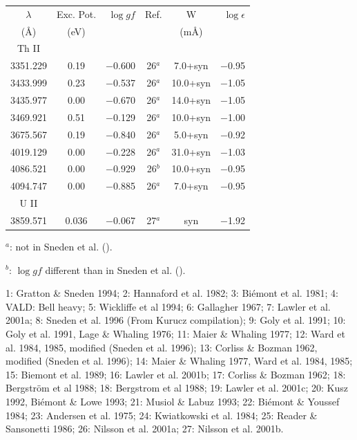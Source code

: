 \documentclass{aa}
\begin{document}
\begin{table}
\begin{tabular}{ccrccr}
\hline\hline
$\lambda$ & Exc. Pot. & $\log gf$ & Ref. & W & $\log \epsilon$ \\
  (\AA)   & (eV)      &           &      & (m\AA) &              \\ 
\hline
Th II\\
\hline
3351.229 & 0.19 & $-$0.600 & 26$^{a}$ &   7.0+syn & $-$0.95\\
3433.999 & 0.23 & $-$0.537 & 26$^{a}$ &  10.0+syn & $-$1.05\\
3435.977 & 0.00 & $-$0.670 & 26$^{a}$ &  14.0+syn & $-$1.05\\
3469.921 & 0.51 & $-$0.129 & 26$^{a}$ &  10.0+syn & $-$1.00\\
3675.567 & 0.19 & $-$0.840 & 26$^{a}$ &   5.0+syn & $-$0.92\\
4019.129 & 0.00 & $-$0.228 & 26$^{a}$ &  31.0+syn & $-$1.03\\
4086.521 & 0.00 & $-$0.929 & 26$^{b}$ &  10.0+syn & $-$0.95\\
4094.747 & 0.00 & $-$0.885 & 26$^{a}$ &   7.0+syn & $-$0.95\\
\hline
U II\\
\hline
3859.571 & 0.036 & $-$0.067 & 27$^{a}$ & syn & $-$1.92 \\
\hline\hline
\end{tabular}

$^{a}$: not in Sneden et al. (\cite{sneden96}).

$^{b}$: $\log gf$ different than in Sneden et al. (\cite{sneden96}).

1: Gratton \& Sneden 1994;
2: Hannaford et al. 1982;
3: Bi\'emont et al. 1981;
4: VALD: Bell heavy; 
5: Wickliffe et al 1994;
6: Gallagher 1967;
7: Lawler et al. 2001a;
8: Sneden et al. 1996 (From Kurucz compilation);
9: Goly et al. 1991;
10: Goly et al. 1991, Lage \& Whaling 1976;
11: Maier \& Whaling 1977;
12: Ward et al. 1984, 1985, modified (Sneden et al. 1996);
13: Corliss \& Bozman 1962, modified (Sneden et al. 1996);
14: Maier \& Whaling 1977, Ward et al. 1984, 1985;
15: Biemont et al. 1989;
16: Lawler et al. 2001b;
17: Corliss \& Bozman 1962;
18: Bergstr\"om et al 1988;
18: Bergstrom et al 1988;
19: Lawler et al. 2001c;
20: Kusz 1992, Bi\'emont \& Lowe 1993;
21: Musiol \& Labuz 1993;
22: Bi\'emont \& Youssef 1984;
23: Andersen et al. 1975;
24: Kwiatkowski et al. 1984;
25: Reader \& Sansonetti 1986;
26: Nilsson et al. 2001a;
27: Nilsson et al. 2001b.

\end{table}
\end{document}
